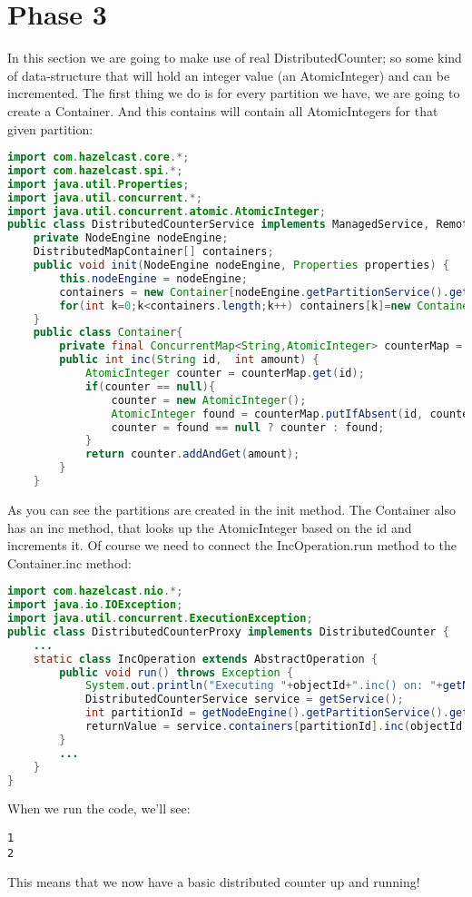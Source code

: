 \section{Phase 3}
In this section we are going to make use of real DistributedCounter; so some kind of data-structure that will hold an integer value (an AtomicInteger) and can be incremented. The first thing we do is for every partition we have, we are going to create a Container. And this contains will contain all AtomicIntegers for that given partition:
\begin{lstlisting}[language=java]
import com.hazelcast.core.*;
import com.hazelcast.spi.*;
import java.util.Properties;
import java.util.concurrent.*;
import java.util.concurrent.atomic.AtomicInteger;
public class DistributedCounterService implements ManagedService, RemoteService {
    private NodeEngine nodeEngine;
    DistributedMapContainer[] containers;
    public void init(NodeEngine nodeEngine, Properties properties) {
        this.nodeEngine = nodeEngine;
        containers = new Container[nodeEngine.getPartitionService().getPartitionCount()];
        for(int k=0;k<containers.length;k++) containers[k]=new Container();
    }
    public class Container{
        private final ConcurrentMap<String,AtomicInteger> counterMap = new ConcurrentHashMap<>();
        public int inc(String id,  int amount) {
            AtomicInteger counter = counterMap.get(id);
            if(counter == null){
                counter = new AtomicInteger();
                AtomicInteger found = counterMap.putIfAbsent(id, counter);
                counter = found == null ? counter : found;
            }
            return counter.addAndGet(amount);
        }
    }
\end{lstlisting}
As you can see the partitions are created in the init method. The Container also has an inc method, that looks up the AtomicInteger based on the id and increments it. Of course we need to connect the IncOperation.run method to the Container.inc method:
\begin{lstlisting}[language=java]
import com.hazelcast.nio.*;
import java.io.IOException;
import java.util.concurrent.ExecutionException;
public class DistributedCounterProxy implements DistributedCounter {
    ... 
    static class IncOperation extends AbstractOperation {
        public void run() throws Exception {
            System.out.println("Executing "+objectId+".inc() on: "+getNodeEngine().getThisAddress());
            DistributedCounterService service = getService();
            int partitionId = getNodeEngine().getPartitionService().getPartitionId(objectId);
            returnValue = service.containers[partitionId].inc(objectId, amount);
        }
        ...
    }
}
\end{lstlisting}
When we run the code, we'll see:
\begin{lstlisting}
1
2
\end{lstlisting}
This means that we now have a basic distributed counter up and running!

